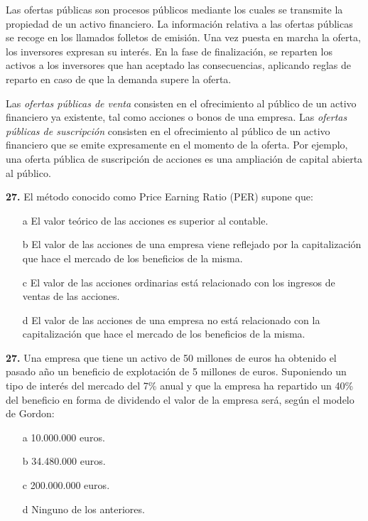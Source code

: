 \documentclass{nuevotema}
\begin{document}
Las ofertas públicas son procesos públicos mediante los cuales se transmite la propiedad de un activo financiero. La información relativa a las ofertas públicas se recoge en los llamados folletos de emisión. Una vez puesta en marcha la oferta, los inversores expresan su interés. En la fase de finalización, se reparten los activos a los inversores que han aceptado las consecuencias, aplicando reglas de reparto en caso de que la demanda supere la oferta.
 
Las \textit{ofertas públicas de venta} consisten en el ofrecimiento al público de un activo financiero ya existente, tal como acciones o bonos de una empresa. Las \textit{ofertas públicas de suscripción} consisten en el ofrecimiento al público de un activo financiero que se emite expresamente en el momento de la oferta. Por ejemplo, una oferta pública de suscripción de acciones es una ampliación de capital abierta al público. 

\preguntas

\textbf{27.} El método conocido como Price Earning Ratio (PER) supone que:

\begin{enumerate}
	\item[a] El valor teórico de las acciones es superior al contable.
	\item[b] El valor de las acciones de una empresa viene reflejado por la capitalización que hace el mercado de los beneficios de la misma.
	\item[c] El valor de las acciones ordinarias está relacionado con los ingresos de ventas de las acciones.
	\item[d] El valor de las acciones de una empresa no está relacionado con la capitalización que hace el mercado de los beneficios de la misma.
\end{enumerate}

\textbf{27.} Una empresa que tiene un activo de 50 millones de euros ha obtenido el pasado año un beneficio de explotación de 5 millones de euros. Suponiendo un tipo de interés del mercado del 7\% anual y que la empresa ha repartido un 40\% del beneficio en forma de dividendo el valor de la empresa será, según el modelo de Gordon:
\begin{enumerate}
	\item[a] 10.000.000 euros.
	\item[b] 34.480.000 euros.
	\item[c] 200.000.000 euros.
	\item[d] Ninguno de los anteriores.
\end{enumerate}
\end{document}

